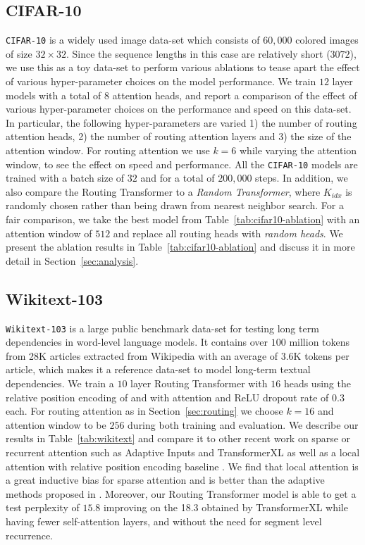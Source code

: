 \subsection{CIFAR-10}\label{sec:cifar}
\texttt{CIFAR-10} is a widely used image data-set which consists of \(60,000\) colored images of size \(32\times 32\). Since the sequence lengths in this case are relatively short (\(3072\)), we use this as a toy data-set to perform various ablations to tease apart the effect of various hyper-parameter choices on the model performance. We train \(12\) layer models with a total of \(8\) attention heads, and report a comparison of the effect of various hyper-parameter choices on the performance and speed on this data-set. In particular, the following hyper-parameters are varied 1) the number of routing attention heads, 2) the number of routing attention layers and 3) the size of the attention window. For routing attention we use \(k = 6\) while varying the attention window, to see the effect on speed and performance. All the \texttt{CIFAR-10} 
models are trained with a batch size of \(32\) and for a total of \(200,000\) steps. In addition, we also compare the Routing Transformer to a \emph{Random Transformer}, where \(K_{idx}\) is randomly chosen rather than being drawn from nearest neighbor search. For a fair comparison, we take the best model from Table~\ref{tab:cifar10-ablation}
with an attention window of \(512\) and replace all routing heads with \emph{random heads}. We present the ablation results in Table~\ref{tab:cifar10-ablation} and discuss it in more detail in Section~\ref{sec:analysis}.

\subsection{Wikitext-103}
\texttt{Wikitext-103} \citep{merity2016pointer} is a large public benchmark data-set for testing long term dependencies in word-level language models. It contains over \(100\) million tokens from 28K articles extracted from Wikipedia with an average of 3.6K tokens per article, which makes it a reference data-set to model long-term textual dependencies. We train a \(10\) layer Routing Transformer with \(16\) heads using the relative position encoding of \citet{shaw2018self} and with attention and ReLU dropout rate of \(0.3\) each. For routing attention as in Section~\ref{sec:routing}
we choose \(k = 16\) and attention window to be \(256\) during both training and evaluation. We describe our results in Table~\ref{tab:wikitext} and compare it to other recent work on sparse or recurrent attention such as Adaptive Inputs \citep{baevski2018adaptive} and TransformerXL \citep{dai2019transformer} as well as a local attention with relative position encoding baseline \citep{huang2018music}. We find that local attention is a great inductive bias for sparse attention and is better than the adaptive methods proposed in 
\citet{baevski2018adaptive, sukhbaatar2019adaptive}. Moreover, our Routing Transformer model is able to get a test perplexity of \(15.8\) improving on the 18.3 obtained by TransformerXL \citep{dai2019transformer} while having fewer self-attention layers, and without the need for segment level recurrence.


